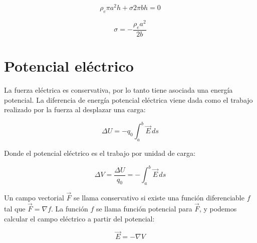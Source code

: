 \documentclass[a4paper,12pt]{article}
\begin{document}
\[
\rho_e \pi a^2 h + \sigma 2\pi b h = 0
\]

\[
\sigma = - \frac{\rho_e a^2}{2b}
\]

\section{Potencial eléctrico}

La fuerza eléctrica es conservativa, por lo tanto tiene asociada una energía potencial.  
La diferencia de energía potencial eléctrica viene dada como el trabajo realizado por la fuerza al desplazar una carga:

\[
\Delta U = - q_0 \int_{a}^{b} \vec{E} \, ds
\]

Donde el potencial eléctrico es el trabajo por unidad de carga:

\[
\Delta V = \frac{\Delta U}{q_0} = - \int_{a}^{b} \vec{E} \, ds
\]

Un campo vectorial $\vec{F}$ se llama conservativo si existe una función diferenciable $f$ tal que $\vec{F} = \nabla f$.  
La función $f$ se llama función potencial para $\vec{F}$, y podemos calcular el campo eléctrico a partir del potencial:

\[
\vec{E} = - \nabla V
\]
\end{document}
